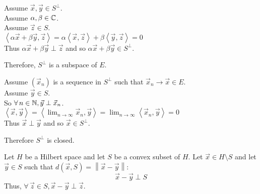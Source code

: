 \documentclass[letterpaper,12pt,fleqn]{article}
\newcommand{\vx}{\vec{x}}
\newcommand{\vy}{\vec{y}}
\newcommand{\vz}{\vec{z}}
\newcommand{\Sp}{S^{\perp}}
\renewcommand{\a}{\alpha}
\renewcommand{\b}{\beta}
\newcommand{\norm}[1]{\left\|#1\right\|}
\newcommand{\inner}[1]{\left<#1\right>}
\begin{document}
\begin{theproof}
  Assume $\vx,\vy\in\Sp$. \\
  Assume $\a,\b\in\C$. \\
  Assume $\vz\in S$. \\
  $\inner{\a\vx+\b\vy,\vz}=\a\inner{\vx,\vz}+\b\inner{\vy,\vz}=0$ \\
  Thus $\a\vx+\b\vy\perp\vz$ and so $\a\vx+\b\vy\in\Sp$.

  Therefore, $\Sp$ is a subspace of $E$.

  Assume $(\vx_n)$ is a sequence in $\Sp$ such that $\vx_n\to\vx\in E$. \\
  Assume $\vy\in S$. \\
  So $\forall\,n\in\N,\vy\perp\vx_n$. \\
  $\inner{\vx,\vy}=\inner{\lim_{n\to\infty}\vx_n,\vy}=
  \lim_{n\to\infty}\inner{\vx_n,\vy}=0$ \\
  Thus $\vx\perp\vy$ and so $\vx\in\Sp$.

  Therefore $\Sp$ is closed.
\end{theproof}

\begin{theorem}
  Let $H$ be a Hilbert space and let $S$ be a convex subset of $H$. Let
  $\vx\in H\setminus S$ and let $\vy\in S$ such that $d(\vx,S)=\norm{\vx-\vy}$:
  \[\vx-\vy\perp S\]
  Thus, $\forall\,\vz\in S,\vx-\vy\perp\vz$.
\end{theorem}
\end{document}
